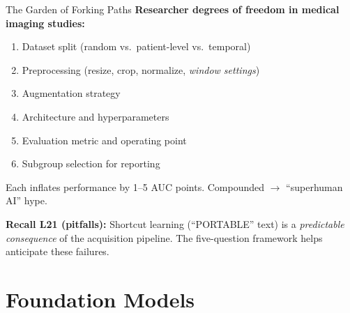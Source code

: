 \documentclass[aspectratio=169,10pt]{beamer}
\begin{document}
\begin{frame}{The Garden of Forking Paths}
\textbf{Researcher degrees of freedom in medical imaging studies:}
\begin{enumerate}[<+->]
    \item Dataset split (random vs.\ patient-level vs.\ temporal)
    \item Preprocessing (resize, crop, normalize, \emph{window settings})
    \item Augmentation strategy
    \item Architecture and hyperparameters
    \item Evaluation metric and operating point
    \item Subgroup selection for reporting
\end{enumerate}

Each inflates performance by 1--5 AUC points. Compounded $\to$ ``superhuman AI'' hype.

\textbf{Recall L21 (pitfalls):} Shortcut learning (``PORTABLE'' text) is a \emph{predictable consequence} of the acquisition pipeline. The five-question framework helps anticipate these failures.
\end{frame}

\section{Foundation Models}
\end{document}

